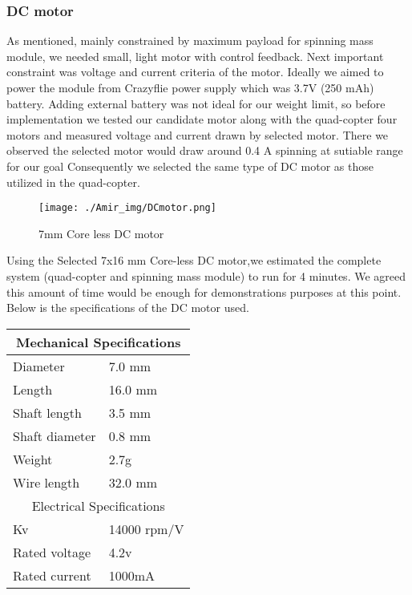 \subsubsection{DC motor}
As mentioned, mainly constrained by maximum payload for spinning mass module, we needed small, light motor with control feedback. Next important constraint was voltage and current criteria of the motor. Ideally we aimed to power the module from Crazyflie power supply which was 3.7V (250 mAh) battery. Adding external battery was not ideal for our weight limit, so before implementation we tested our candidate motor along with the quad-copter four motors and measured voltage and current drawn by selected motor. There we observed the selected motor would draw around 0.4 A spinning at sutiable range for our goal Consequently we selected the same type of DC motor as those utilized in the quad-copter. 
\begin{figure}[h]
\centering
\texttt{[image: ./Amir\_img/DCmotor.png]}
\caption{7mm Core less DC motor}
\end{figure}
\newline 
Using the Selected 7x16 mm Core-less DC motor,we estimated the complete system (quad-copter and spinning mass module) to run for 4 minutes. We agreed this amount of time would be enough for demonstrations purposes at this point. Below is the specifications of the DC motor used.
\newline
\begin{center}
\begin{tabular}{ |p{3cm}|p{3cm}|  }
 \hline
 \multicolumn{2}{|c|}{Mechanical Specifications} \\
 \hline
 Diameter   & 7.0 mm    \\
 Length &   16.0 mm  \\
 Shaft length & 3.5 mm  \\
 Shaft diameter    & 0.8 mm \\
 Weight &   2.7g \\
 Wire length & 32.0 mm  \\
 \hline
 \multicolumn{2}{|c|}{Electrical Specifications} \\
 \hline 
 Kv & 14000 rpm/V \\
 Rated voltage & 4.2v \\
 Rated current & 1000mA\\
 \hline
\end{tabular}
\end{center}
  
